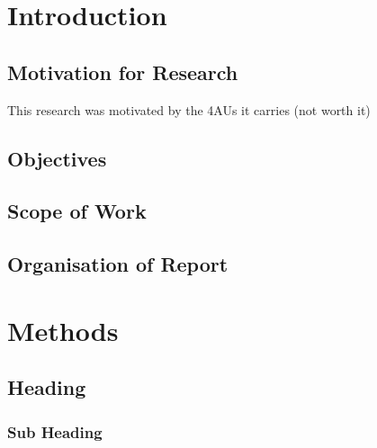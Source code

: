 \documentclass[12pt]{article}
\begin{document}
\pagebreak
\renewcommand{\cftdotsep}{0.5}
\renewcommand{\cftsecleader}{\cftdotfill{\cftdotsep}}
\renewcommand{\contentsname}{Table of Contents}  %
\setlength{\cftbeforesecskip}{10pt}   %
\setlength{\cftbeforesubsecskip}{10pt} %
\setlength{\cftbeforesubsubsecskip}{10pt} %
\renewcommand{\cftsecpresnum}{Chapter~} %
\renewcommand{\cftsecaftersnum}{\quad} 
\setlength{\cftsecnumwidth}{6.1em}   %
\tableofcontents

\pagebreak
{}
\section{Introduction}

\subsection{Motivation for Research}

This research was motivated by the 4AUs it carries (not worth it)

\subsection{Objectives}

\subsection{Scope of Work}

\subsection{Organisation of Report}

\pagebreak
\section{Methods}

\subsection{Heading} %

\subsubsection{Sub Heading}
\end{document}
